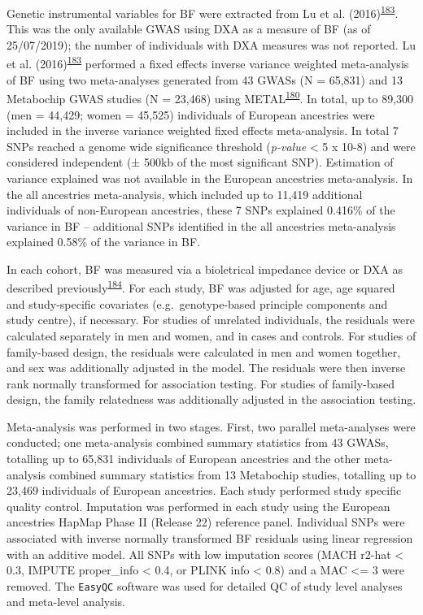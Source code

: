 \documentclass[11pt,twoside]{bristolthesis}
\begin{document}
Genetic instrumental variables for BF were extracted from Lu et al. (2016)\textsuperscript{\protect\hyperlink{ref-Lu2016}{183}}. This was the only available GWAS using DXA as a measure of BF (as of 25/07/2019); the number of individuals with DXA measures was not reported. Lu et al. (2016)\textsuperscript{\protect\hyperlink{ref-Lu2016}{183}} performed a fixed effects inverse variance weighted meta-analysis of BF using two meta-analyses generated from 43 GWASs (N = 65,831) and 13 Metabochip GWAS studies (N = 23,468) using METAL\textsuperscript{\protect\hyperlink{ref-Willer2010a}{180}}. In total, up to 89,300 (men = 44,429; women = 45,525) individuals of European ancestries were included in the inverse variance weighted fixed effects meta-analysis. In total 7 SNPs reached a genome wide significance threshold (\emph{p-value} \textless{} 5 x 10-8) and were considered independent (± 500kb of the most significant SNP). Estimation of variance explained was not available in the European ancestries meta-analysis. In the all ancestries meta-analysis, which included up to 11,419 additional individuals of non-European ancestries, these 7 SNPs explained 0.416\% of the variance in BF -- additional SNPs identified in the all ancestries meta-analysis explained 0.58\% of the variance in BF.

In each cohort, BF was measured via a bioletrical impedance device or DXA as described previously\textsuperscript{\protect\hyperlink{ref-Kilpelainen2011b}{184}}. For each study, BF was adjusted for age, age squared and study-specific covariates (e.g.~genotype-based principle components and study centre), if necessary. For studies of unrelated individuals, the residuals were calculated separately in men and women, and in cases and controls. For studies of family-based design, the residuals were calculated in men and women together, and sex was additionally adjusted in the model. The residuals were then inverse rank normally transformed for association testing. For studies of family-based design, the family relatedness was additionally adjusted in the association testing.

Meta-analysis was performed in two stages. First, two parallel meta-analyses were conducted; one meta-analysis combined summary statistics from 43 GWASs, totalling up to 65,831 individuals of European ancestries and the other meta-analysis combined summary statistics from 13 Metabochip studies, totalling up to 23,469 individuals of European ancestries. Each study performed study specific quality control. Imputation was performed in each study using the European ancestries HapMap Phase II (Release 22) reference panel. Individual SNPs were associated with inverse normally transformed BF residuals using linear regression with an additive model. All SNPs with low imputation scores (MACH r2-hat \textless{} 0.3, IMPUTE proper\_info \textless{} 0.4, or PLINK info \textless{} 0.8) and a MAC \textless{}= 3 were removed. The \texttt{EasyQC} software was used for detailed QC of study level analyses and meta-level analysis.
\end{document}
